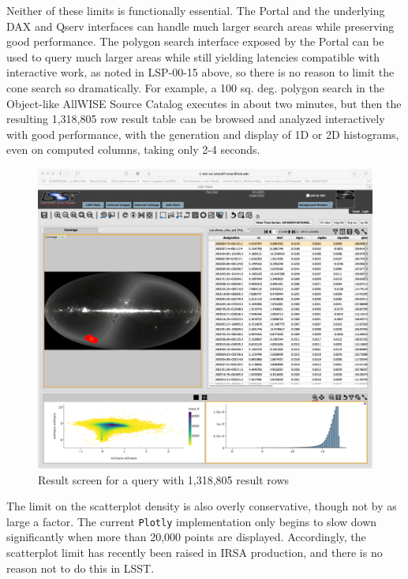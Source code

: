 Neither of these limits is functionally essential.
The Portal and the underlying DAX and Qserv interfaces can handle much larger search areas while preserving good performance.
The polygon search interface exposed by the Portal can be used to query much larger areas while still yielding latencies compatible with interactive work, as noted in LSP-00-15 above,
so there is no reason to limit the cone search so dramatically.
For example, a 100 sq. deg. polygon search in the Object-like AllWISE Source Catalog executes in about two minutes,
but then the resulting 1,318,805 row result table can be browsed and analyzed interactively with good performance,
with the generation and display of 1D or 2D histograms, even on computed columns, taking only 2-4 seconds.

\begin{figure}
  \includegraphics[width=\linewidth]{lsp-00-20/million-query.png}
  \caption{Result screen for a query with 1,318,805 result rows}
  \label{fig:lsp-00-20-million-query}
\end{figure}

The limit on the scatterplot density is also overly conservative, though not by as large a factor.
The current \verb|Plotly| implementation only begins to slow down significantly when more than 20,000 points are displayed.
Accordingly, the scatterplot limit has recently been raised in IRSA production, and there is no reason not to do this in LSST.

